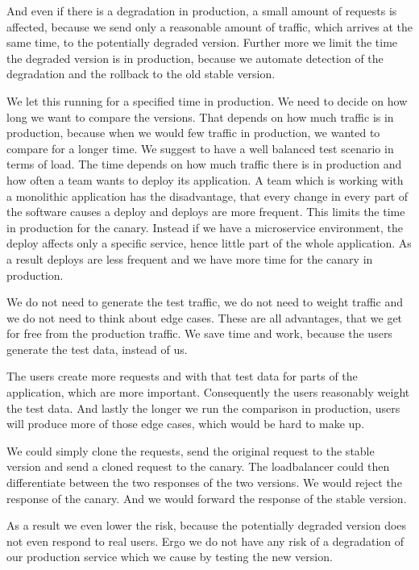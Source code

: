 And even if there is a degradation in production, a small amount of requests is affected,
because we send only a reasonable amount of traffic, which arrives at the same time, to
the potentially degraded version. Further more we limit the time the degraded version is
in production, because we automate detection of the degradation and the rollback to the
old stable version.


We let this running for a specified time in production. We need to decide on how long we
want to compare the versions. That depends on how much traffic is in production, because
when we would few traffic in production, we wanted to compare for a longer time. We
suggest to have a well balanced test scenario in terms of load. The time depends on how
much traffic there is in production and how often a team wants to deploy its
application. A team which is working with a monolithic application has the disadvantage,
that every change in every part of the software causes a deploy and deploys are more
frequent. This limits the time in production for the canary. Instead if we have a
microservice environment, the deploy affects only a specific service, hence little part of
the whole application. As a result deploys are less frequent and we have more time for the
canary in production.

We do not need to generate the test traffic, we do not need to weight traffic and we do
not need to think about edge cases. These are all advantages, that we get for free from
the production traffic. We save time and work, because the users generate the test data,
instead of us.

The users create more requests and with that test data for parts of the application, which
are more important. Consequently the users reasonably weight the test data. And lastly the
longer we run the comparison in production, users will produce more of those edge cases,
which would be hard to make up.

We could simply clone the requests, send the original request to the stable version and
send a cloned request to the canary. The loadbalancer could then differentiate between the
two responses of the two versions. We would reject the response of the canary. And we
would forward the response of the stable version.

As a result we even lower the risk, because the potentially degraded version does not even
respond to real users. Ergo we do not have any risk of a degradation of our production
service which we cause by testing the new version.

